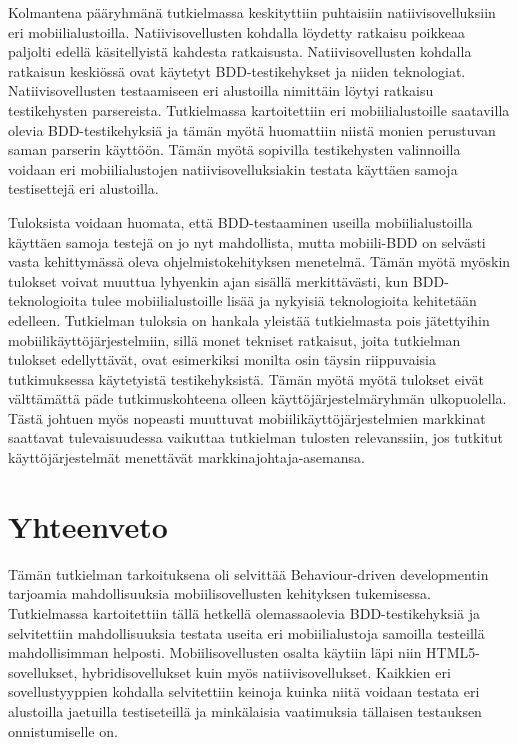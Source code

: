 \documentclass[finnish,nonumbib,nocopyright]{gradu2}
\begin{document}
Kolmantena pääryhmänä tutkielmassa keskityttiin puhtaisiin natiivisovelluksiin eri mobiilialustoilla. Natiivisovellusten kohdalla löydetty ratkaisu poikkeaa paljolti edellä käsitellyistä kahdesta ratkaisusta. Natiivisovellusten kohdalla ratkaisun keskiössä ovat käytetyt BDD-testikehykset ja niiden teknologiat. Natiivisovellusten testaamiseen eri alustoilla nimittäin löytyi ratkaisu testikehysten parsereista. Tutkielmassa kartoitettiin eri mobiilialustoille saatavilla olevia BDD-testikehyksiä ja tämän myötä huomattiin niistä monien perustuvan saman parserin käyttöön. Tämän myötä sopivilla testikehysten valinnoilla voidaan eri mobiilialustojen natiivisovelluksiakin testata käyttäen samoja testisettejä eri alustoilla.
 
Tuloksista voidaan huomata, että BDD-testaaminen useilla mobiilialustoilla käyttäen samoja testejä on jo nyt mahdollista, mutta mobiili-BDD on selvästi vasta kehittymässä oleva ohjelmistokehityksen menetelmä. Tämän myötä myöskin tulokset voivat muuttua lyhyenkin ajan sisällä merkittävästi, kun BDD-teknologioita tulee mobiilialustoille lisää ja nykyisiä teknologioita kehitetään edelleen. Tutkielman tuloksia on hankala yleistää tutkielmasta pois jätettyihin mobiilikäyttöjärjestelmiin, sillä monet tekniset ratkaisut, joita tutkielman tulokset edellyttävät, ovat esimerkiksi monilta osin täysin riippuvaisia tutkimuksessa käytetyistä testikehyksistä. Tämän myötä myötä tulokset eivät välttämättä päde tutkimuskohteena olleen käyttöjärjestelmäryhmän ulkopuolella. Tästä johtuen myös nopeasti muuttuvat mobiilikäyttöjärjestelmien markkinat saattavat tulevaisuudessa vaikuttaa tutkielman tulosten relevanssiin, jos tutkitut käyttöjärjestelmät menettävät markkinajohtaja-asemansa.

\chapter{Yhteenveto}

Tämän tutkielman tarkoituksena oli selvittää Behaviour-driven developmentin tarjoamia mahdollisuuksia mobiilisovellusten kehityksen tukemisessa. Tutkielmassa kartoitettiin tällä hetkellä olemassaolevia BDD-testikehyksiä ja selvitettiin mahdollisuuksia testata useita eri mobiilialustoja samoilla testeillä mahdollisimman helposti. Mobiilisovellusten osalta käytiin läpi niin HTML5-sovellukset, hybridisovellukset kuin myös natiivisovellukset. Kaikkien eri sovellustyyppien kohdalla selvitettiin keinoja kuinka niitä voidaan testata eri alustoilla jaetuilla testiseteillä ja minkälaisia vaatimuksia tällaisen testauksen onnistumiselle on.
\end{document}
